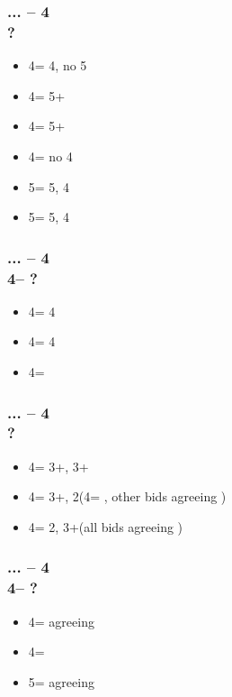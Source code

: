 \documentclass[12pt, a4paper]{report}
\begin{document}
{{{            \subsubsection*{... -- 4\clubs\\
                            ?}
            \begin{itemize}
                \item 4\diams = 4\minor, no 5\minor
                \item 4\hearts = 5+\clubs
                \item 4\spades = 5+\diams
                \item 4\nt = no 4\minor
                \item 5\clubs = 5\clubs, 4\diams
                \item 5\diams = 5\diams, 4\clubs
            \end{itemize}

            \subsubsection*{... -- 4\clubs\\
                            4\diams -- ?}
            \begin{itemize}
                \item 4\hearts = 4\clubs
                \item 4\spades = 4\diams
                \item 4\nt = \soff
            \end{itemize}

            \subsubsection*{... -- 4\diams\\
                            ?}
            \begin{itemize}
                \item 4\hearts = 3+\clubs, 3+\diams
                \item 4\spades = 3+\clubs, 2\diams (4\nt = \soff, other bids agreeing \clubs)
                \item 4\nt = 2\clubs, 3+\diams (all bids agreeing \diams)
            \end{itemize}

            \subsubsection*{... -- 4\diams\\
                            4\hearts -- ?}
            \begin{itemize}
                \item 4\spades = agreeing \clubs
                \item 4\nt = \soff
                \item 5\clubs = agreeing \diams
            \end{itemize}

}}}
\end{document}
